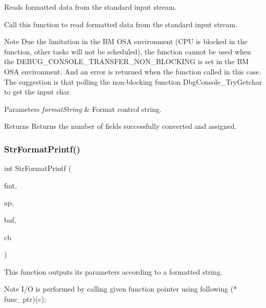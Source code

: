 Reads formatted data from the standard input stream. 

Call this function to read formatted data from the standard input stream.

\begin{DoxyNote}{Note}
Due the limitation in the BM O\+SA environment (C\+PU is blocked in the function, other tasks will not be scheduled), the function cannot be used when the D\+E\+B\+U\+G\+\_\+\+C\+O\+N\+S\+O\+L\+E\+\_\+\+T\+R\+A\+N\+S\+F\+E\+R\+\_\+\+N\+O\+N\+\_\+\+B\+L\+O\+C\+K\+I\+NG is set in the BM O\+SA environment. And an error is returned when the function called in this case. The suggestion is that polling the non-\/blocking function Dbg\+Console\+\_\+\+Try\+Getchar to get the input char.
\end{DoxyNote}

\begin{DoxyParams}{Parameters}
{\em format\+String} & Format control string. \\
\hline
\end{DoxyParams}
\begin{DoxyReturn}{Returns}
Returns the number of fields successfully converted and assigned. 
\end{DoxyReturn}
\mbox{\label{group__debugconsole_ga50b9d66ac2ba38b23b99dac4e81f4b8c}} 
\subsubsection{\texorpdfstring{StrFormatPrintf()}{StrFormatPrintf()}}
{\footnotesize\ttfamily int Str\+Format\+Printf (\begin{DoxyParamCaption}\item[{const char $\ast$}]{fmt,  }\item[{va\+\_\+list}]{ap,  }\item[{char $\ast$}]{buf,  }\item[{\mbox{\hyperlink{group__debugconsole_ga85e7bd4e26348dd4b87e4c3a600868c9}{printf\+Cb}}}]{cb }\end{DoxyParamCaption})}



This function outputs its parameters according to a formatted string. 

\begin{DoxyNote}{Note}
I/O is performed by calling given function pointer using following ($\ast$func\+\_\+ptr)(c);
\end{DoxyNote}

